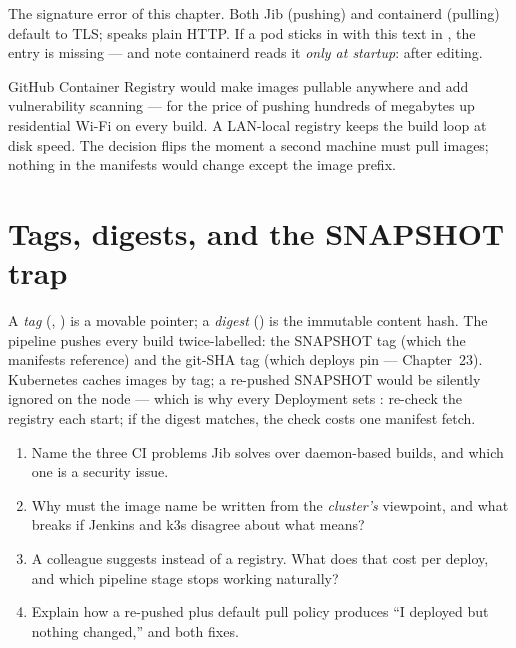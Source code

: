 \begin{pitfall}
The signature error of this chapter. Both Jib (pushing) and containerd
(pulling) default to TLS;  speaks plain HTTP. If a pod
sticks in  with this text in
, the  entry is missing
--- and note containerd reads it \emph{only at startup}:
 after editing.
\end{pitfall}

\begin{decision}
GitHub Container Registry would make images pullable anywhere and add
vulnerability scanning --- for the price of pushing hundreds of megabytes
up residential Wi-Fi on every build. A LAN-local registry keeps the
build loop at disk speed. The decision flips the moment a second machine
must pull images; nothing in the manifests would change except the
image prefix.
\end{decision}

\section{Tags, digests, and the SNAPSHOT trap}

A \emph{tag} (, ) is a movable
pointer; a \emph{digest} () is the immutable content
hash. The pipeline pushes every build twice-labelled: the SNAPSHOT tag
(which the manifests reference) and the git-SHA tag (which deploys pin
--- Chapter~23). Kubernetes caches images by tag; a re-pushed SNAPSHOT
would be silently ignored on the node --- which is why every Deployment
sets : re-check the registry each start;
if the digest matches, the check costs one manifest fetch.

\begin{quiz}
\begin{enumerate}
  \item Name the three CI problems Jib solves over
  daemon-based builds, and which one is a security issue.
  \item Why must the image name be written from the \emph{cluster's}
  viewpoint, and what breaks if Jenkins and k3s disagree about what
   means?
  \item A colleague suggests 
  instead of a registry. What does that cost per deploy, and which
  pipeline stage stops working naturally?
  \item Explain how a re-pushed  plus default pull
  policy produces ``I deployed but nothing changed,'' and both fixes.
\end{enumerate}
\end{quiz}
